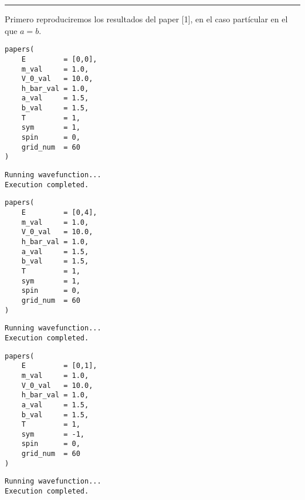 \documentclass[11pt]{article}
\begin{document}
\noindent\rule{\textwidth}{0.5pt}
Primero reproduciremos los resultados del paper [1], en el caso partícular en
el que \(a = b\).
\begin{verbatim}
papers(
    E         = [0,0],
    m_val     = 1.0,
    V_0_val   = 10.0,
    h_bar_val = 1.0,
    a_val     = 1.5,
    b_val     = 1.5,
    T         = 1,
    sym       = 1,
    spin      = 0,
    grid_num  = 60
)
\end{verbatim}

\label{org7c90040}
\begin{verbatim}
Running wavefunction...
Execution completed.
\end{verbatim}

\begin{center}

\end{center}

\begin{verbatim}
papers(
    E         = [0,4],
    m_val     = 1.0,
    V_0_val   = 10.0,
    h_bar_val = 1.0,
    a_val     = 1.5,
    b_val     = 1.5,
    T         = 1,
    sym       = 1,
    spin      = 0,
    grid_num  = 60
)
\end{verbatim}

\label{org8b46671}
\begin{verbatim}
Running wavefunction...
Execution completed.
\end{verbatim}

\begin{center}

\end{center}

\begin{verbatim}
papers(
    E         = [0,1],
    m_val     = 1.0,
    V_0_val   = 10.0,
    h_bar_val = 1.0,
    a_val     = 1.5,
    b_val     = 1.5,
    T         = 1,
    sym       = -1,
    spin      = 0,
    grid_num  = 60
)
\end{verbatim}

\label{org56aa845}
\begin{verbatim}
Running wavefunction...
Execution completed.
\end{verbatim}

\begin{center}

\end{center}
\end{document}
